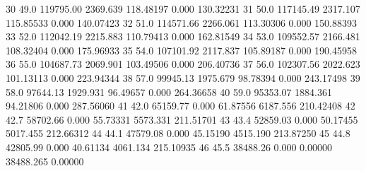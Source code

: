 \documentclass{article}
\begin{document}
\begin{Schunk}
\begin{Soutput}
30 49.0  119795.00  2369.639 118.48197     0.000 130.32231
31 50.0  117145.49  2317.107 115.85533     0.000 140.07423
32 51.0  114571.66  2266.061 113.30306     0.000 150.88393
33 52.0  112042.19  2215.883 110.79413     0.000 162.81549
34 53.0  109552.57  2166.481 108.32404     0.000 175.96933
35 54.0  107101.92  2117.837 105.89187     0.000 190.45958
36 55.0  104687.73  2069.901 103.49506     0.000 206.40736
37 56.0  102307.56  2022.623 101.13113     0.000 223.94344
38 57.0   99945.13  1975.679  98.78394     0.000 243.17498
39 58.0   97644.13  1929.931  96.49657     0.000 264.36658
40 59.0   95353.07  1884.361  94.21806     0.000 287.56060
41 42.0   65159.77     0.000  61.87556  6187.556 210.42408
42 42.7   58702.66     0.000  55.73331  5573.331 211.51701
43 43.4   52859.03     0.000  50.17455  5017.455 212.66312
44 44.1   47579.08     0.000  45.15190  4515.190 213.87250
45 44.8   42805.99     0.000  40.61134  4061.134 215.10935
46 45.5   38488.26     0.000   0.00000 38488.265   0.00000
\end{Soutput}
\end{Schunk}
\end{document}
